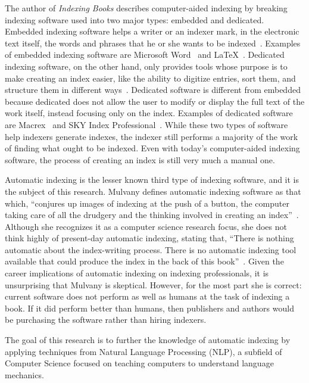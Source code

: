 The author of {\it Indexing Books} describes computer-aided indexing by breaking indexing software used into two major types: embedded and dedicated.
Embedded indexing software helps a writer or an indexer mark, in the electronic text itself, the words and phrases that he or she wants to be indexed~\cite{mulvany}.
Examples of embedded indexing software are Microsoft Word~\cite{ms-word-indexing} and \LaTeX~\cite{lamport}.
Dedicated indexing software, on the other hand, only provides tools whose purpose is to make creating an index easier, like the ability to digitize entries, sort them, and structure them in different ways~\cite{mulvany}.
Dedicated software is different from embedded because dedicated does not allow the user to modify or display the full text of the work itself, instead focusing only on the index.
Examples of dedicated software are Macrex~\cite{macrex} and SKY Index Professional~\cite{sky-software}.
While these two types of software help indexers generate indexes, the indexer still performs a majority of the work of finding what ought to be indexed.
Even with today's computer-aided indexing software, the process of creating an index is still very much a manual one.

Automatic indexing is the lesser known third type of indexing software, and it is the subject of this research.
Mulvany defines automatic indexing software as that which, ``conjures up images of indexing at the push of a button, the computer taking care of all the drudgery and the thinking involved in creating an index''~\cite{mulvany}.
Although she recognizes it as a computer science research focus, she does not think highly of present-day automatic indexing, stating that, ``There is nothing automatic about the index-writing process.
There is no automatic indexing tool available that could produce the index in the back of this book''~\cite{mulvany}.
Given the career implications of automatic indexing on indexing professionals, it is unsurprising that Mulvany is skeptical.
However, for the most part she is correct: current software does not perform as well as humans at the task of indexing a book.
If it did perform better than humans, then publishers and authors would be purchasing the software rather than hiring indexers.

The goal of this research is to further the knowledge of automatic indexing by applying techniques from Natural Language Processing (NLP), a subfield of Computer Science focused on teaching computers to understand language mechanics.
